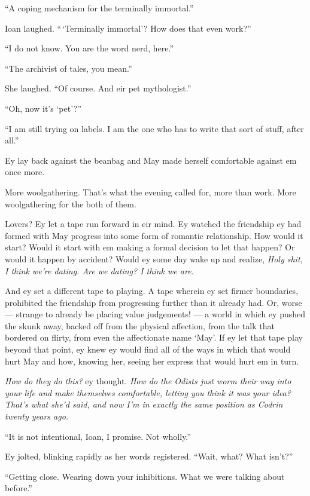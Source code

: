 ``A coping mechanism for the terminally immortal.''

Ioan laughed. ``\,`Terminally immortal'? How does that even work?''

``I do not know. You are the word nerd, here.''

``The archivist of tales, you mean.''

She laughed. ``Of course. And eir pet mythologist.''

``Oh, now it's `pet'?''

``I am still trying on labels. I am the one who has to write that sort of stuff, after all.''

Ey lay back against the beanbag and May made herself comfortable against em once more.

More woolgathering. That's what the evening called for, more than work. More woolgathering for the both of them.

Lovers? Ey let a tape run forward in eir mind. Ey watched the friendship ey had formed with May progress into some form of romantic relationship. How would it start? Would it start with em making a formal decision to let that happen? Or would it happen by accident? Would ey some day wake up and realize, \emph{Holy shit, I think we're dating. Are we dating? I think we are.}

And ey set a different tape to playing. A tape wherein ey set firmer boundaries, prohibited the friendship from progressing further than it already had. Or, worse — strange to already be placing value judgements! — a world in which ey pushed the skunk away, backed off from the physical affection, from the talk that bordered on flirty, from even the affectionate name `May'. If ey let that tape play beyond that point, ey knew ey would find all of the ways in which that would hurt May and how, knowing her, seeing her express that would hurt em in turn.

\emph{How do they do this?} ey thought. \emph{How do the Odists just worm their way into your life and make themselves comfortable, letting you think it was your idea? That's what she'd said, and now I'm in exactly the same position as Codrin twenty years ago.}

``It is not intentional, Ioan, I promise. Not wholly.''

Ey jolted, blinking rapidly as her words registered. ``Wait, what? What isn't?''

``Getting close. Wearing down your inhibitions. What we were talking about before.''

